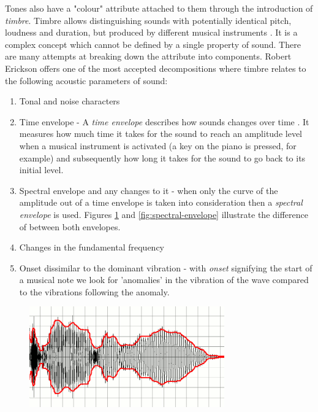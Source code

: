 Tones also have a "colour" attribute attached to them through the introduction
of \textit{timbre}. Timbre allows distinguishing sounds with potentially
identical pitch, loudness and duration, but produced by different musical
instruments \cite{klapuri2007signal}. It is a complex concept which cannot be
defined by a single property of sound. There are many attempts at breaking down
the attribute into components. Robert Erickson \cite{erickson1975sound} offers
one of the most accepted decompositions where timbre relates to the following
acoustic parameters of sound:
\begin{enumerate}
    \item Tonal and noise characters
    \item Time envelope - A \textit{time envelope} describes how sounds changes
    over time \cite{wiki:envelope}. It measures how much time it takes for the sound to reach an
    amplitude level when a musical instrument is activated (a key on the piano
    is pressed, for example) and subsequently how long it takes for the sound to
    go back to its initial level. 
    \item Spectral envelope and any changes to it - when only the curve of the
    amplitude out of a time envelope is taken into consideration then a
    \textit{spectral envelope} is used. Figures \ref{fig:time-envelope} and
    \ref{fig:spectral-envelope} illustrate the difference of between both envelopes.
    \item Changes in the fundamental frequency
    \item Onset dissimilar to the dominant vibration - with \textit{onset}
    signifying the start of a musical note we look for 'anomalies' in
    the vibration of the wave compared to the vibrations following the anomaly.

\end{enumerate}

\begin{figure}
    \centering
    \includegraphics[width=0.75\textwidth]{BackgroundTheory/time_envelope.png}
    \label{fig:time-envelope}
\end{figure}

